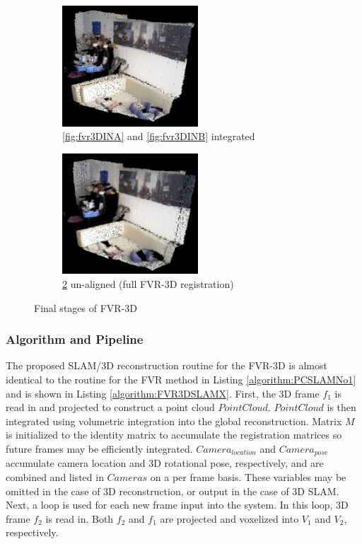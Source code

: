 \begin{figure}[!htb]
        \begin{subfigure}[b]{3.0in}
               \centering
                \includegraphics[width=2.0in]{images/methodology/FVR/fvr3d/noRegistration}
                \caption{\ref{fig:fvr3DINA} and \ref{fig:fvr3DINB} integrated}
                \label{fig:fvr3DPCAAB}
        \end{subfigure}%
        \begin{subfigure}[b]{3.0in}
               \centering
                \includegraphics[width=2.0in]{images/methodology/FVR/fvr3d/FVR3DReg}
                \caption{\ref{fig:fvr3DFVRPCAAB} un-aligned (full FVR-3D registration)}
                \label{fig:fvr3DFVRPCAAB}
        \end{subfigure}        
        
       \caption{Final stages of FVR-3D}
       \label{fig:FVR3D222}
\end{figure}



\subsubsection{Algorithm and Pipeline}

\label{METHOD_SECLL}

The proposed SLAM/3D reconstruction routine for the FVR-3D is almost identical to the routine for the FVR method in Listing \ref{algorithm:PCSLAMNo1} and is shown in Listing \ref{algorithm:FVR3DSLAMX}. First, the 3D frame $f_1$ is read in and projected to construct a point cloud $PointCloud$. $PointCloud$ is then integrated using volumetric integration into the global reconstruction. Matrix $M$ is initialized to the identity matrix to accumulate the registration matrices so future frames may be efficiently integrated. $Camera_{location}$ and $Camera_{pose}$ accumulate camera location and 3D rotational pose, respectively, and are combined and listed in $Cameras$ on a per frame basis. These variables may be omitted in the case of 3D reconstruction, or output in the case of 3D SLAM. Next, a loop is used for each new frame input into the system. In this loop, 3D frame $f_2$ is read in. Both $f_2$ and $f_1$ are projected and voxelized into $V_1$ and $V_2$, respectively. \\

